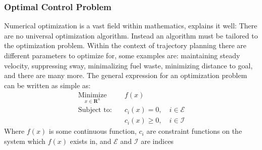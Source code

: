 \subsubsection*{Optimal Control Problem}
Numerical optimization is a vast field within mathematics, \cite{wright1999numerical} explains it well: There are no universal optimization algorithm. Instead an algorithm must be tailored to the optimization
problem. Within the context of trajectory planning there are different parameters to optimize for, some examples are: maintaining steady velocity, suppressing sway, minimalizing
fuel waste, minimizing distance to goal, and there are many more. The general expression for an optimization problem can be written as simple as:
\begin{subequations}
    \begin{align}
    \underset{x\in \textbf{R}^n}{\textrm{Minimize}} \quad & f(x) \\
        \textrm{Subject to:} \quad & c_i(x) = 0, \quad i \in \mathcal{E} \\
                             \quad & c_i(x) \geq 0, \quad i \in \mathcal{I} 
    \end{align}
\end{subequations}
Where $f(x)$ is some continuous function, $c_i$ are constraint functions on the system which $f(x)$ exists in, and $\mathcal{E}$ and $\mathcal{I}$ are indices
